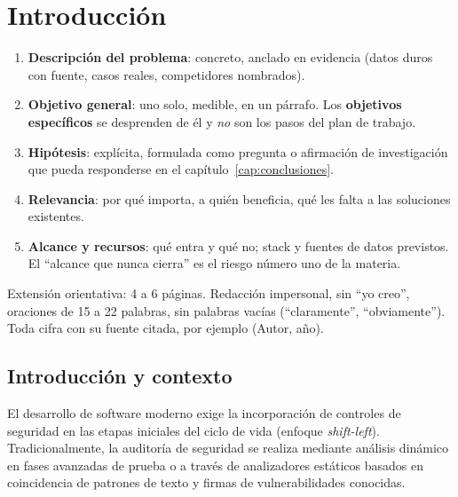 
\chapter{Introducción}\label{cap:introduccion}

\begin{guia}
\begin{enumerate}
    \item \textbf{Descripción del problema}: concreto, anclado en evidencia
          (datos duros con fuente, casos reales, competidores nombrados).
    \item \textbf{Objetivo general}: uno solo, medible, en un párrafo.
          Los \textbf{objetivos específicos} se desprenden de él y
          \emph{no} son los pasos del plan de trabajo.
    \item \textbf{Hipótesis}: explícita, formulada como pregunta o
          afirmación de investigación que pueda responderse en el
          capítulo~\ref{cap:conclusiones}.
    \item \textbf{Relevancia}: por qué importa, a quién beneficia, qué les
          falta a las soluciones existentes.
    \item \textbf{Alcance y recursos}: qué entra y qué no; stack y fuentes
          de datos previstos. El ``alcance que nunca cierra'' es el riesgo
          número uno de la materia.
\end{enumerate}
Extensión orientativa: 4 a 6 páginas. Redacción impersonal, sin ``yo
creo'', oraciones de 15 a 22 palabras, sin palabras vacías
(``claramente'', ``obviamente''). Toda cifra con su fuente citada, por
ejemplo (Autor, año).
\end{guia}

\section{Introducción y contexto}\label{sec:n1.1}

El desarrollo de software moderno exige la incorporación de controles de seguridad en las etapas iniciales del ciclo de vida (enfoque \emph{shift-left}). Tradicionalmente, la auditoría de seguridad se realiza mediante análisis dinámico en fases avanzadas de prueba o a través de analizadores estáticos basados en coincidencia de patrones de texto y firmas de vulnerabilidades conocidas.


